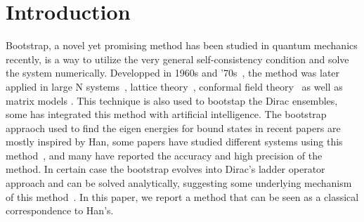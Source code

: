 \documentclass[aps, preprint,amsmath, amssymb]{revtex4-2}
\begin{document}

\maketitle

\section{Introduction}

Bootstrap, a novel yet promising method has been studied in quantum mechanics recently, is a way to utilize the very general self-consistency condition and solve the system numerically.
Developped in 1960s and '70s~\cite{enwiki:1195984682}, the method was later applied in large N systems~\cite{JEVICKI1983169, JEVICKI1984299, RODRIGUES1985350}, lattice theory~\cite{ANDERSON2017702, lawrence2021bootstrapping, Kazakov_2023, refId0}, conformal field theory~\cite{RevModPhys.91.015002, PhysRevLett.127.081601, PhysRevD.86.025022, El_Showk_2012, El_Showk_2014, Simmons_Duffin_2017} as well as matrix models \cite{Lin_2020, Kazakov_2022}. This technique is also used to bootstap the Dirac ensembles\cite{Hessam_2022}, some has integrated this method with artificial intelligence\cite{K_ntor_2022, K_ntor_20221}.
The bootstrap appraoch used to find the eigen energies for bound states in recent papers are mostly inspired by Han\cite{Han_2020}, some papers have studied different systems using this method~\cite{Bhattacharya:2021btd, Berenstein:2021loy, Du:2021hfw, Aikawa_2022, Tchoumakov_2021, bai2022bootstrapping, Berenstein:2021dyf}, and many have reported the accuracy and high precision of the method.
In certain case the bootstrap evolves into Dirac's ladder operator approach and can be solved analytically, suggesting some underlying mechanism of this method~\cite{Aikawa:2021qbl}. In this paper, we report a method that can be seen as a classical correspondence to Han's.
\end{document}

